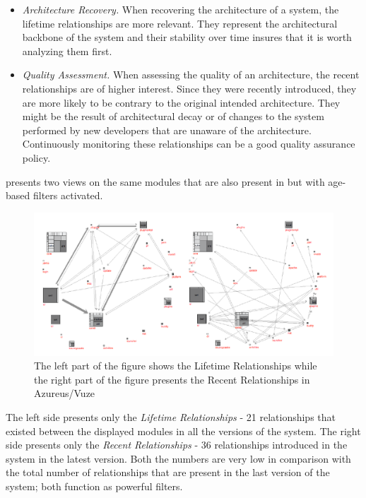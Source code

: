 \documentclass[preprint,12pt]{elsarticle}
\begin{document}
\begin{itemize}

\item {\em Architecture Recovery.} When recovering the architecture of a system, the lifetime relationships are more relevant. They represent the architectural backbone of the system and their stability over time insures that it is worth analyzing them first.

\item {\em Quality Assessment.} When assessing the quality of an architecture, the recent relationships are of higher interest. Since they were recently introduced, they are more likely to be contrary to the original intended architecture. They might be the result of architectural decay or of changes to the system performed by new developers that are unaware of the architecture. Continuously monitoring these relationships can be a good quality assurance policy.
\end{itemize}



 presents two views on the same modules that are also present in  but with age-based filters activated. 

\begin{figure}[ht]
\begin{center}
\includegraphics[width=\linewidth]{Architecture-LifetimeVsRecent}
\caption{The left part of the figure shows the Lifetime Relationships while the right part of the figure presents the Recent Relationships in Azureus/Vuze}
\end{center}
\end{figure}

The left side presents only the {\em Lifetime Relationships} - 21 relationships that existed between the displayed modules in all the versions of the system. The right side presents only the {\em Recent Relationships} - 36 relationships introduced in the system in the latest version. Both the numbers are very low in comparison with the total number of relationships that are present in the last version of the system; both function as powerful filters.
\end{document}
